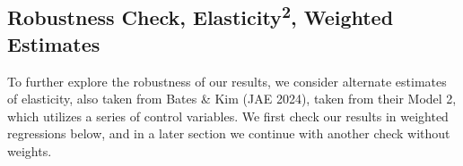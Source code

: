 \begin{table}[H]
	\begin{center}
		
		\label{transportation_estimates}
		\caption[Transportation Infrastructure Predictor Estimates, Unweighted]{Continuing as described in table \ref{main_estimates}, we find largely similar results in our unweighted regressions.}
	\end{center}
\end{table}

\begin{table}[H]
	\begin{center}
		
		\label{demographic_estimates}
		\caption[Demographic Predictor Estimates, Unweighted]{Continuing as described in table \ref{main_estimates}, we find largely similar results in our unweighted regressions.}
	\end{center}
\end{table}

\begin{table}[H]
	\begin{center}
		
		\label{pop_share_estimates}
		\caption[Cheaper Gas Border Predictor Estimates, Unweighted]{Continuing as described in table \ref{main_estimates}, we find largely similar results in our unweighted regressions.}
	\end{center}
\end{table}

\subsection{Robustness Check, Elasticity\textsuperscript{2}, Weighted Estimates}
To further explore the robustness of our results, we consider alternate estimates of elasticity, also taken from Bates \& Kim (JAE 2024), taken from their Model 2, which utilizes a series of control variables. We first check our results in weighted regressions below, and in a later section we continue with another check without weights. \\

